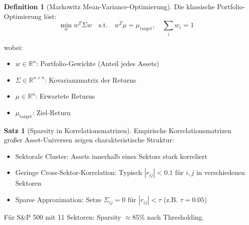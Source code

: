 \documentclass[a4paper,12pt]{report}
\theoremstyle{definition}
\newtheorem{definition}{Definition}
\newtheorem{satz}{Satz}
\begin{document}
	\begin{definition}[Markowitz Mean-Variance-Optimierung]
		Die klassische Portfolio-Opti\-mierung löst:
		\[
		\min_{w} w^T \Sigma w \quad \text{s.t.} \quad w^T \mu = \mu_{\text{target}}, \quad \sum_i w_i = 1
		\]
		
		wobei:
		\begin{itemize}
			\item $w \in \mathbb{R}^n$: Portfolio-Gewichte (Anteil jedes Assets)
			\item $\Sigma \in \mathbb{R}^{n \times n}$: Kovarianzmatrix der Returns
			\item $\mu \in \mathbb{R}^n$: Erwartete Returns
			\item $\mu_{\text{target}}$: Ziel-Return
		\end{itemize}
	\end{definition}
	
	\begin{satz}[Sparsity in Korrelationsmatrizen]
		Empirische Korrelationsmatrizen großer Asset-Universen zeigen charakteristische Struktur:
		\begin{itemize}
			\item Sektorale Cluster: Assets innerhalb eines Sektors stark korreliert
			\item Geringe Cross-Sektor-Korrelation: Typisch $|r_{ij}| < 0.1$ für $i, j$ in verschiedenen Sektoren
			\item Sparse Approximation: Setze $\Sigma_{ij} = 0$ für $|r_{ij}| < \tau$ (z.B. $\tau = 0.05$)
		\end{itemize}
		
		Für S\&P 500 mit 11 Sektoren: Sparsity $\approx 85\%$ nach Thresholding.
	\end{satz}
	
\end{document}
